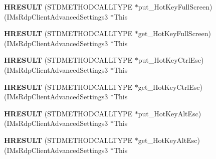 \begin{DoxyCompactItemize}
\item 
\mbox{\label{struct_i_ms_rdp_client_advanced_settings3_vtbl_a25463cad3cccaa9e0998b6d7e23fd628}} 
{\bfseries H\+R\+E\+S\+U\+LT} (S\+T\+D\+M\+E\+T\+H\+O\+D\+C\+A\+L\+L\+T\+Y\+PE $\ast$put\+\_\+\+Hot\+Key\+Full\+Screen)(I\+Ms\+Rdp\+Client\+Advanced\+Settings3 $\ast$This
\item 
\mbox{\label{struct_i_ms_rdp_client_advanced_settings3_vtbl_add2d314a52729e3b38e1e1a04c669e4b}} 
{\bfseries H\+R\+E\+S\+U\+LT} (S\+T\+D\+M\+E\+T\+H\+O\+D\+C\+A\+L\+L\+T\+Y\+PE $\ast$get\+\_\+\+Hot\+Key\+Full\+Screen)(I\+Ms\+Rdp\+Client\+Advanced\+Settings3 $\ast$This
\item 
\mbox{\label{struct_i_ms_rdp_client_advanced_settings3_vtbl_a47f0368529fdda43f78f1f2f63376502}} 
{\bfseries H\+R\+E\+S\+U\+LT} (S\+T\+D\+M\+E\+T\+H\+O\+D\+C\+A\+L\+L\+T\+Y\+PE $\ast$put\+\_\+\+Hot\+Key\+Ctrl\+Esc)(I\+Ms\+Rdp\+Client\+Advanced\+Settings3 $\ast$This
\item 
\mbox{\label{struct_i_ms_rdp_client_advanced_settings3_vtbl_a6e444bf8e6dd65db65b0eb602bcdfdbe}} 
{\bfseries H\+R\+E\+S\+U\+LT} (S\+T\+D\+M\+E\+T\+H\+O\+D\+C\+A\+L\+L\+T\+Y\+PE $\ast$get\+\_\+\+Hot\+Key\+Ctrl\+Esc)(I\+Ms\+Rdp\+Client\+Advanced\+Settings3 $\ast$This
\item 
\mbox{\label{struct_i_ms_rdp_client_advanced_settings3_vtbl_ace9a11d9f065003c7fd9989220e429b8}} 
{\bfseries H\+R\+E\+S\+U\+LT} (S\+T\+D\+M\+E\+T\+H\+O\+D\+C\+A\+L\+L\+T\+Y\+PE $\ast$put\+\_\+\+Hot\+Key\+Alt\+Esc)(I\+Ms\+Rdp\+Client\+Advanced\+Settings3 $\ast$This
\item 
\mbox{\label{struct_i_ms_rdp_client_advanced_settings3_vtbl_a1c3870372381cedb9b5e8b07af81465b}} 
{\bfseries H\+R\+E\+S\+U\+LT} (S\+T\+D\+M\+E\+T\+H\+O\+D\+C\+A\+L\+L\+T\+Y\+PE $\ast$get\+\_\+\+Hot\+Key\+Alt\+Esc)(I\+Ms\+Rdp\+Client\+Advanced\+Settings3 $\ast$This
\item 
\mbox{\label{struct_i_ms_rdp_client_advanced_settings3_vtbl_a80b2598b6e49f0439a8d72ba66d2c941}} 

\end{DoxyCompactItemize}
